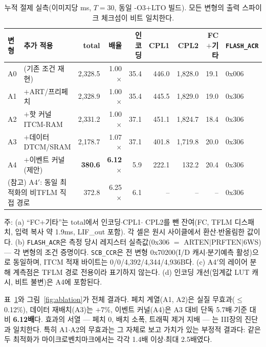 \begin{table}[t]
\centering
\caption{누적 절제 실측(이미지당 ms, $T=30$, 동일 -O3+LTO 빌드).
모든 변형의 출력 스파이크 체크섬이 비트 일치한다.}
\label{tab:ablation}
\footnotesize
\setlength{\tabcolsep}{4.5pt}
\begin{tabular}{l l r r r r r r l}
\hline
변형 & 추가 적용 & total & 배율 & 인코딩 & CPL1 & CPL2 & FC$+$기타 & \texttt{FLASH\_ACR} \\
\hline
A0 & (기존 조건 재현) & 2,328.5 & 1.00$\times$ & 35.4 & 446.0 & 1,828.0 & 19.1 & 0x006 \\
A1 & $+$ART/프리페치 & 2,328.9 & 1.00$\times$ & 35.4 & 445.5 & 1,829.0 & 19.0 & 0x306 \\
A2 & $+$핫 커널 ITCM-RAM & 2,331.2 & 1.00$\times$ & 37.1 & 451.1 & 1,824.7 & 18.4 & 0x306 \\
A3 & $+$데이터 DTCM/SRAM & 2,178.7 & 1.07$\times$ & 37.1 & 401.8 & 1,719.8 & 20.0 & 0x306 \\
A4 & $+$이벤트 커널(제안) & \textbf{380.6} & \textbf{6.12$\times$} & 5.9 & 222.1 & 132.2 & 20.4 & 0x306 \\
\hline
\multicolumn{2}{l}{(참고) A4$'$: 동일 최적화의 비TFLM 직접 경로} &
372.8 & 6.25$\times$ & 6.1 & -- & -- & -- & 0x306 \\
\hline
\end{tabular}
\begin{flushleft}
\footnotesize 주: (a) ``FC$+$기타''는 total에서 인코딩$\cdot$CPL1$\cdot$
CPL2를 뺀 잔여(FC, TFLM 디스패치, 입력 복사 약 1.9ms, LIF\_out 포함).
각 셀은 원시 사이클에서 환산$\cdot$반올림한 값이다.
(b) \texttt{FLASH\_ACR}은 측정 당시 레지스터 실측값(0x306 $=$
ARTEN$|$PRFTEN$|$6WS) --- 각 변형의 조건 증명이다.
\texttt{SCB\_CCR}은 전 변형 0x70200(I/D 캐시$\cdot$분기예측 활성)으로
동일하며, ITCM 적재 바이트는 0/0/4,392/4,344/4,936B다. (c) A4$'$의 레이어
분해 계측점은 TFLM 경로 전용이라 표기하지 않는다. (d) 인코딩
개선(임계값 LUT 캐시, 비트 불변)은 A4에 포함된다.
\end{flushleft}
\end{table}

표~\ref{tab:ablation}와 그림~\ref{fig:ablation}가 전체 결과다.
페치 계열(A1, A2)은 실질 무효과($\le$0.12\%), 데이터 재배치(A3)는
$+$7\%, 이벤트 커널(A4)은 A3 대비 단독 5.7배$\cdot$기준 대비
\textbf{6.12배}다. 효과의 서열 --- 페치 $0$, 배치 소폭, 트래픽 제거
지배 --- 는 III장의 진단과 일치한다. 특히 A1$\cdot$A2의
무효과는 그 자체로 보고 가치가 있는 부정적 결과다: 같은 두 최적화가
마이크로벤치마크에서는 각각 1.4배 이상$\cdot$최대 2.5배였다.

